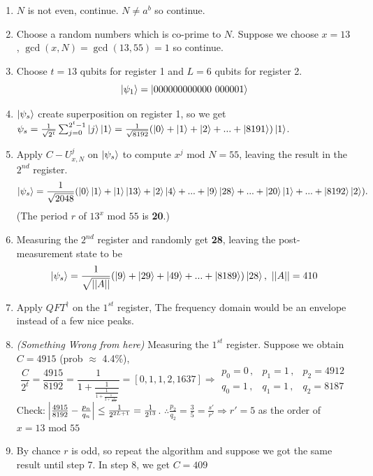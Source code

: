 \documentclass[]{book}
\theoremstyle{nonumberplain}
\begin{document}
    \begin{enumerate}
        \item $N$ is not even, continue. $N \neq a^b$ so continue.
        \item Choose a random numbers which is co-prime to $N$. Suppose we choose \textbf{$x=13$}, \textbf{$\gcd(x,N)=\gcd(13,55)=1$} so continue.
        \item Choose \textbf{$t=13$} qubits for register 1 and \textbf{$L=6$} qubits for register 2. 
        $$\ket{\psi_1} = \ket{000000000000\ 000001}$$
        \item $\ket{\psi_s} $ create superposition on register 1, so we get $\psi_s = \frac{1}{\sqrt{2^t}} \sum_{j=0}^{2^t-1} \ket{j}\ket{1} = \frac{1}{\sqrt{8192}}(\ket{0}+\ket{1}+\ket{2}+...+\ket{8191})\ket{1} $.
        \item Apply $C-U^{j}_{x,N} $ on $\ket{\psi_s}$ to compute $x^j \text{ mod }N=55$, leaving the result in the $2^{nd}$ register.
        $$\ket{\psi_s} = \frac{1}{\sqrt{2048}} (\ket{0}\ket{1}+\ket{1}\ket{13}+\ket{2}\ket{4}+...+\ket{9}\ket{28}+...+\ket{20}\ket{1}+...+\ket{8192}\ket{2}).$$ (The period $r$ of $13^x \text{ mod }55$ is \textbf{20}.)
        \item Measuring the $2^{nd}$ register and randomly get \textbf{28}, leaving the post-measurement state to be
        $$\ket{\psi_s} = \frac{1}{\sqrt{||A||}} (\ket{9}+\ket{29}+\ket{49}+...+\ket{8189})\ket{28}, \ ||A||=410$$
        \item Apply $QFT^{\dagger}$ on the $1^{st}$ register, The frequency domain would be an envelope instead of a few nice peaks. 
        \item \emph{(Something Wrong from here)} Measuring the $1^{st}$ register. 
        Suppose we obtain $C=4915$ (prob $\approx$ 4.4\%),
        \[
        \frac{C}{2^t}=\frac{4915}{8192}=\frac{1}{1+\frac{1}{\frac{1}{1+\frac{1}{2+\frac{1}{1637}}}}}=[0,1,1,2,1637] \Rightarrow 
        \begin{matrix}
            p_0 = 0\,, & p_1 = 1\,, & p_2 = 4912\\
            q_0 = 1\,, & q_1 = 1\,, & q_2 = 8187
        \end{matrix}
        \]
        Check: $\abs{\frac{4915}{8192}-\frac{p_n}{q_n}} \leq \frac{1}{2^{2L+1}} = \frac{1}{2^{13}}$.
        $\therefore \frac{p_2}{q_2}=\frac{3}{5}=\frac{s'}{r'} \Rightarrow r'=5$ as the order of $x=13 \text{ mod }55$
        \item By chance $r$ is odd, so repeat the algorithm and suppose we got the same result until step 7. In step 8, we get $C=409$ 

\end{enumerate}
\end{document}
